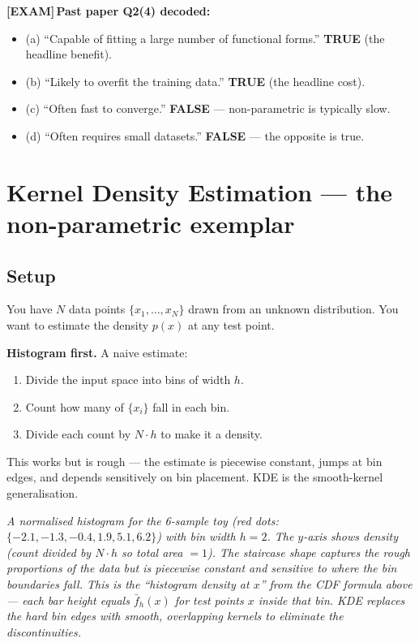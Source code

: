 \documentclass[11pt, a4paper]{article}
\newcommand{\examflag}{\textcolor{tipBd}{\textbf{[EXAM]}}\,}
\begin{document}
\examflag{}\textbf{Past paper Q2(4) decoded:}
\begin{itemize}
  \item (a) ``Capable of fitting a large number of functional forms.'' \textbf{TRUE} (the headline benefit).
  \item (b) ``Likely to overfit the training data.'' \textbf{TRUE} (the headline cost).
  \item (c) ``Often fast to converge.'' \textbf{FALSE} — non-parametric is typically slow.
  \item (d) ``Often requires small datasets.'' \textbf{FALSE} — the opposite is true.
\end{itemize}

\section{Kernel Density Estimation — the non-parametric exemplar}

\subsection{Setup}

You have $N$ data points $\{x_1, \ldots, x_N\}$ drawn from an unknown distribution. You want to estimate the density $p(x)$ at any test point.

\textbf{Histogram first.} A naive estimate:
\begin{enumerate}
  \item Divide the input space into bins of width $h$.
  \item Count how many of $\{x_i\}$ fall in each bin.
  \item Divide each count by $N\cdot h$ to make it a density.
\end{enumerate}
This works but is rough — the estimate is piecewise constant, jumps at bin edges, and depends sensitively on bin placement. KDE is the smooth-kernel generalisation.

\begin{center}

\footnotesize\textit{A normalised histogram for the 6-sample toy (red dots: $\{-2.1, -1.3, -0.4, 1.9, 5.1, 6.2\}$) with bin width $h = 2$. The $y$-axis shows \emph{density} (count divided by $N \cdot h$ so total area $= 1$). The staircase shape captures the rough proportions of the data but is piecewise constant and sensitive to where the bin boundaries fall. This is the ``histogram density at $x$'' from the CDF formula above --- each bar height equals $\bar f_h(x)$ for test points $x$ inside that bin. KDE replaces the hard bin edges with smooth, overlapping kernels to eliminate the discontinuities.}
\end{center}
\end{document}
